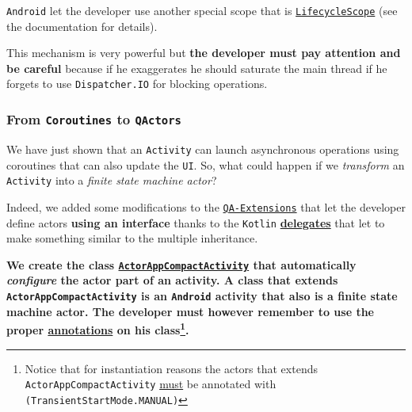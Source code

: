 \texttt{Android} let the developer use another special scope that is \href{https://developer.android.com/topic/libraries/architecture/coroutines#lifecyclescope}{\texttt{LifecycleScope}} (see the documentation for details).

This mechanism is very powerful but \textbf{the developer must pay attention and be careful} because if he exaggerates he should saturate the main thread if he forgets to use  \texttt{Dispatcher.IO} for blocking operations.

\subsubsection{From \texttt{Coroutines} to \texttt{QActors}}

We have just shown that an \texttt{Activity} can launch asynchronous operations using coroutines that can also update the \texttt{UI}. So, what could happen if we \textit{transform} an \texttt{Activity} into a \textit{finite state machine actor}?

Indeed, we added some modifications to the \href{https://github.com/LM-96/QA-Extensions}{\texttt{QA-Extensions}} that let the developer define actors \textbf{using an interface} thanks to the \texttt{Kotlin} \href{https://kotlinlang.org/docs/delegated-properties.html}{\textbf{delegates}} that let to make something similar to the multiple inheritance.

\begin{tcolorbox}
	\begin{center}
		\textbf{We create the class \href{https://github.com/LucaLand/MobileSystemsProject-LL/blob/0.9.1/app/src/main/java/it/unibo/mobilesystems/actors/ActorAppCompactActivity.kt}{\texttt{ActorAppCompactActivity}} that automatically \textit{configure} the actor part of an activity. A class that extends \texttt{ActorAppCompactActivity} is an \texttt{Android} activity that also is a finite state machine actor. The developer must however remember to use the proper \href{https://github.com/LM-96/QA-Extensions/tree/android/it.unibo.qakactor/src/main/kotlin/annotations}{annotations} on his class\footnote{Notice that for instantiation reasons the actors that extends \texttt{ActorAppCompactActivity} \underline{must} be annotated with \texttt{\@StartMode(TransientStartMode.MANUAL)}}.}
	\end{center}
\end{tcolorbox}

 

